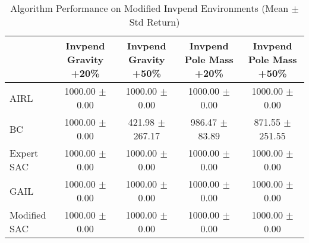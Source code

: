 \begin{table}
\caption{Algorithm Performance on Modified Invpend Environments (Mean $\pm$ Std Return)}
\label{tab:perf_mod_invpend}
\begin{tabular}{lcccc}
\toprule
 & Invpend Gravity +20\% & Invpend Gravity +50\% & Invpend Pole Mass +20\% & Invpend Pole Mass +50\% \\
\midrule
AIRL & 1000.00 $\pm$ 0.00 & 1000.00 $\pm$ 0.00 & 1000.00 $\pm$ 0.00 & 1000.00 $\pm$ 0.00 \\
BC & 1000.00 $\pm$ 0.00 & 421.98 $\pm$ 267.17 & 986.47 $\pm$ 83.89 & 871.55 $\pm$ 251.55 \\
Expert SAC & 1000.00 $\pm$ 0.00 & 1000.00 $\pm$ 0.00 & 1000.00 $\pm$ 0.00 & 1000.00 $\pm$ 0.00 \\
GAIL & 1000.00 $\pm$ 0.00 & 1000.00 $\pm$ 0.00 & 1000.00 $\pm$ 0.00 & 1000.00 $\pm$ 0.00 \\
Modified SAC & 1000.00 $\pm$ 0.00 & 1000.00 $\pm$ 0.00 & 1000.00 $\pm$ 0.00 & 1000.00 $\pm$ 0.00 \\
\bottomrule
\end{tabular}
\end{table}
